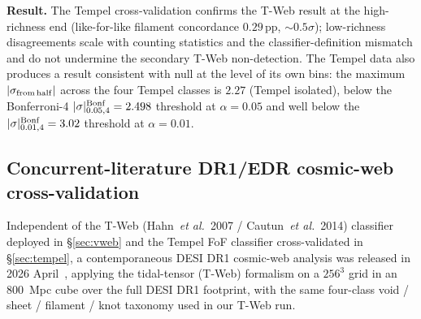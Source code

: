 \documentclass[twocolumn,linenumbers]{aastex702}
\begin{document}
\textbf{Result.} The Tempel cross-validation confirms the T-Web
result at the high-richness end (like-for-like filament concordance
$0.29$\,pp, ${\sim}0.5\sigma$);
low-richness disagreements scale with counting statistics and the
classifier-definition mismatch and do not undermine the
secondary T-Web non-detection. The Tempel data also produces a
result consistent with null at the level of its own bins: the maximum
$|\sigma_{\rm from\,half}|$ across the four Tempel classes is
$2.27$ (Tempel isolated), below the Bonferroni-4
$|\sigma|^{\rm Bonf}_{0.05,4}=2.498$ threshold at $\alpha = 0.05$ and
well below the
$|\sigma|^{\rm Bonf}_{0.01,4}=3.02$ threshold at $\alpha = 0.01$.

\subsection{Concurrent-literature DR1/EDR cosmic-web
cross-validation}\label{sec:tweb_concurrent}

Independent of the T-Web (Hahn~\textit{et al.}~2007 / Cautun~\textit{et
al.}~2014) classifier deployed in \S\ref{sec:vweb} and the Tempel FoF
classifier cross-validated in \S\ref{sec:tempel}, a contemporaneous
DESI DR1 cosmic-web analysis was released in 2026
April~\cite{TWebDESI2026}, applying the tidal-tensor (T-Web) formalism
on a $256^{3}$ grid in an $800$~Mpc cube over the full DESI DR1
footprint, with the same four-class void / sheet / filament / knot
taxonomy used in our T-Web run.
\end{document}
